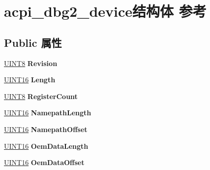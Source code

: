 \hypertarget{structacpi__dbg2__device}{}\section{acpi\+\_\+dbg2\+\_\+device结构体 参考}
\label{structacpi__dbg2__device}
\subsection*{Public 属性}
\begin{DoxyCompactItemize}
\item 
\mbox{\label{structacpi__dbg2__device_a609fc1d6e8d214ed2eb55c878e220f6f}} 
\hyperlink{_processor_bind_8h_ab27e9918b538ce9d8ca692479b375b6a}{U\+I\+N\+T8} {\bfseries Revision}
\item 
\mbox{\label{structacpi__dbg2__device_ab32fd3542600ed173e3524cae776cd1b}} 
\hyperlink{_processor_bind_8h_a09f1a1fb2293e33483cc8d44aefb1eb1}{U\+I\+N\+T16} {\bfseries Length}
\item 
\mbox{\label{structacpi__dbg2__device_ad19b21298e11a1c88c1ba5da1a9ae752}} 
\hyperlink{_processor_bind_8h_ab27e9918b538ce9d8ca692479b375b6a}{U\+I\+N\+T8} {\bfseries Register\+Count}
\item 
\mbox{\label{structacpi__dbg2__device_a03f14e87548ee374bdb045e4605f3e60}} 
\hyperlink{_processor_bind_8h_a09f1a1fb2293e33483cc8d44aefb1eb1}{U\+I\+N\+T16} {\bfseries Namepath\+Length}
\item 
\mbox{\label{structacpi__dbg2__device_aa5cdd8650661539ba1d81175585aae55}} 
\hyperlink{_processor_bind_8h_a09f1a1fb2293e33483cc8d44aefb1eb1}{U\+I\+N\+T16} {\bfseries Namepath\+Offset}
\item 
\mbox{\label{structacpi__dbg2__device_a996be7f906ed0b8caa0722772fbf305b}} 
\hyperlink{_processor_bind_8h_a09f1a1fb2293e33483cc8d44aefb1eb1}{U\+I\+N\+T16} {\bfseries Oem\+Data\+Length}
\item 
\mbox{\label{structacpi__dbg2__device_a96cb5d2e3eb7c366fec57fdfeac0c5cd}} 
\hyperlink{_processor_bind_8h_a09f1a1fb2293e33483cc8d44aefb1eb1}{U\+I\+N\+T16} {\bfseries Oem\+Data\+Offset}

\end{DoxyCompactItemize}
